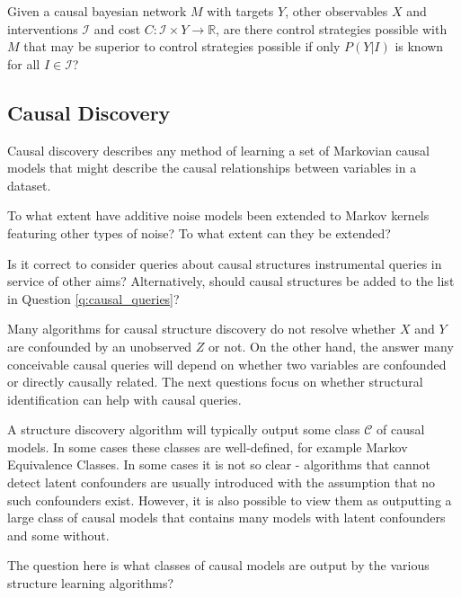 \begin{question}
    Given a causal bayesian network $M$ with targets $Y$, other observables $X$ and interventions $\mathcal{I}$ and cost $C:\mathcal{I}\times Y\to\mathbb{R}$, are there control strategies possible with $M$ that may be superior to control strategies possible if only $P(Y|I)$ is known for all $I\in\mathcal{I}$?
\end{question}

\subsection{Causal Discovery}

Causal discovery describes any method of learning a set of Markovian causal models that might describe the causal relationships between variables in a dataset.

\begin{question}
    To what extent have additive noise models been extended to Markov kernels featuring other types of noise? To what extent can they be extended?
\end{question}

\begin{question}
    Is it correct to consider queries about causal structures instrumental queries in service of other aims? Alternatively, should causal structures be added to the list in Question \ref{q:causal_queries}?
\end{question}

Many algorithms for causal structure discovery do not resolve whether $X$ and $Y$ are confounded by an unobserved $Z$ or not. On the other hand, the answer many conceivable causal queries will depend on whether two variables are confounded or directly causally related. The next questions focus on whether structural identification can help with causal queries.

\begin{question}\label{q:discovery_set_of_models}
    A structure discovery algorithm will typically output some class $\mathcal{C}$ of causal models. In some cases these classes are well-defined, for example Markov Equivalence Classes. In some cases it is not so clear - algorithms that cannot detect latent confounders are usually introduced with the assumption that no such confounders exist. However, it is also possible to view them as outputting a large class of causal models that contains many models with latent confounders and some without.
    
    The question here is what classes of causal models are output by the various structure learning algorithms?
\end{question}

